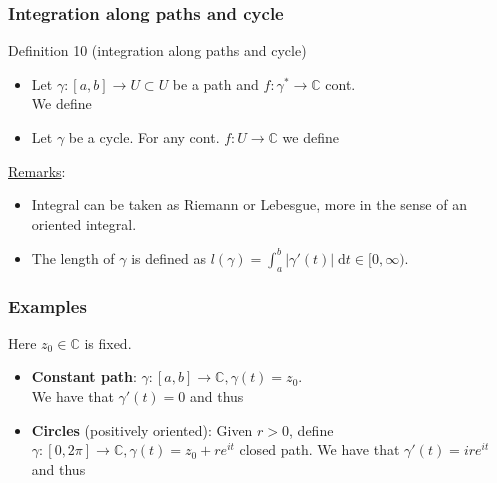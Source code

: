\documentclass[10pt]{beamer}
\newcommand{\C}{\mathbb{C}}
\begin{document}
{\begin{frame} \frametitle{Integration along paths and cycle}
\begin{alertblock}{Definition 10 (integration along paths and cycle)}
\begin{itemize}
\item[(i)] Let $\gamma:[a,b] \rightarrow U \subset U$ be a path and $f:\gamma^*\rightarrow \C$ cont.\\
We define\\
\vspace{1cm}
\item[(ii)]Let $\gamma$ be a cycle. For any cont. $f:U\rightarrow \C$ we define\\
\vspace{1cm}
\end{itemize}
\end{alertblock}
\underline{Remarks}:
\begin{itemize}
\item Integral can be taken as Riemann or Lebesgue, more in the sense of an oriented integral. 
\item The length of $\gamma$ is defined as $l(\gamma)=\int_{a}^b |\gamma'(t)| \; \text{d}t \in [0, \infty).$
\end{itemize}
\end{frame}


\begin{frame} \frametitle{Examples}
Here $z_0\in \C$ is fixed.\\
\vspace{0.2cm}
\begin{itemize}
\item[(1)] \textbf{Constant path}: $\gamma:[a,b] \rightarrow \C, \gamma(t)=z_0.$\\
We have that $\gamma'(t)=0$ and thus\\
\vspace{1cm}
\item[(2)] \textbf{Circles} (positively oriented): 
Given $r>0$, define $\gamma:[0,2\pi] \rightarrow \C, \gamma(t)=z_0+re^{it}$ closed path.
We have that $\gamma'(t)=ire^{it}$ and thus\
\vspace{1cm}
\end{itemize}
\end{frame}

}
\end{document}
